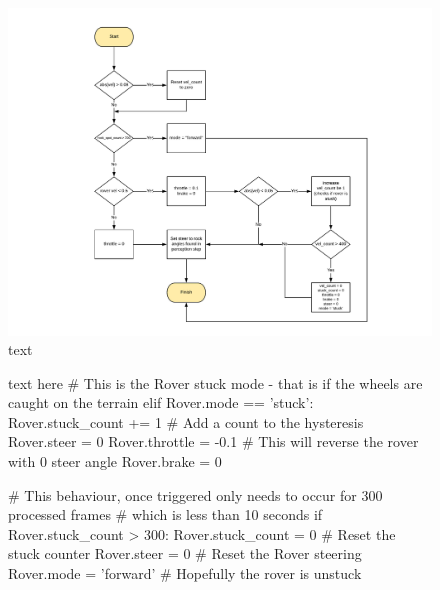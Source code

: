 \documentclass[a4paper]{article}
\begin{document}
\begin{figure}[h]
\hspace{-0.5cm}
\includegraphics[scale=0.6]{rocking_flow}
\caption{text}
\end{figure}

\begin{figure}[h]\scriptsize
\begin{sexylisting}{text here}
# This is the Rover stuck mode - that is if the wheels are caught on the terrain        
        elif Rover.mode == 'stuck':
            Rover.stuck_count += 1 # Add a count to the hysteresis
            Rover.steer = 0
            Rover.throttle = -0.1 # This will reverse the rover with 0 steer angle
            Rover.brake = 0
            
            # This behaviour, once triggered only needs to occur for 300 processed frames
            # which is less than 10 seconds
            if Rover.stuck_count > 300:
                Rover.stuck_count = 0 # Reset the stuck counter
                Rover.steer = 0 # Reset the Rover steering
                Rover.mode = 'forward' # Hopefully the rover is unstuck
\end{sexylisting}
\end{figure}
\end{document}
